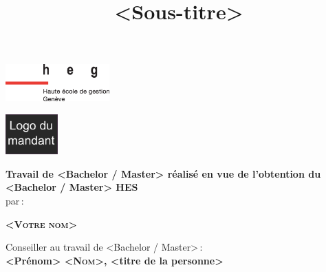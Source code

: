  

\title{\textbf{}\\
\textbf{<Sous-titre>}}

\begin{flushleft}
\includegraphics[width=4cm]{images/heg-logo.eps}
\end{flushleft}

\date{\vspace{0.2cm}}

\maketitle
\noindent \begin{center}
\includegraphics[width=2cm]{images/logo-mandant.png}				%
\par\end{center}{\Large \par}

\date{\vspace{4cm}
}

\noindent \begin{center}
\textbf{Travail de <Bachelor / Master> réalisé en vue de l’obtention du <Bachelor / Master>
HES}\\
par\textbf{\,}:
\par\end{center}
\noindent \begin{center}
\textbf{ \textsc{<Votre nom>}}
\par\end{center}{\Large \par}

\noindent \begin{center}
{\Large Conseiller au travail de <Bachelor / Master>\,:}\\
\textbf{\Large{} <Prénom> \textsc{<Nom>}, <titre de la personne>}
\par\end{center}{\Large \par}

